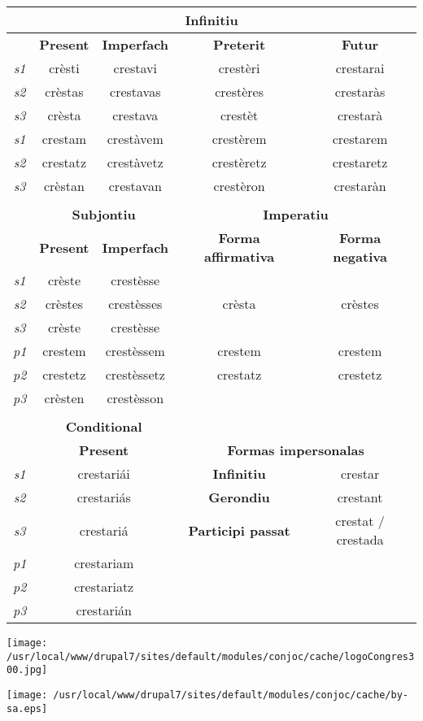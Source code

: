\documentclass[10pt,a4paper,final]{article}
\begin{document}
\begin{tabular}{|c|c|c|c|c|}
\hline 
\multicolumn{5}{|c|}{\textbf{Infinitiu}} \\ 
\hline 
 & \textbf{Present} & \textbf{Imperfach} & \textbf{Preterit} & \textbf{Futur} \\ 
\hline 
\textit{s1} & crèsti & crestavi & crestèri & crestarai \\ 
\hline 
\textit{s2} & crèstas & crestavas & crestères & crestaràs \\ 
\hline 
\textit{s3} & crèsta & crestava & crestèt & crestarà \\ 
\hline 
\textit{s1} & crestam & crestàvem & crestèrem & crestarem \\ 
\hline 
\textit{s2} & crestatz & crestàvetz & crestèretz & crestaretz \\ 
\hline 
\textit{s3} & crèstan & crestavan & crestèron & crestaràn \\ 
\hline 
\multicolumn{5}{|c|}{} \\ 
\hline 
 & \multicolumn{2}{c|}{\textbf{Subjontiu}}  & \multicolumn{2}{c|}{\textbf{Imperatiu}} \\ 
\hline 
 & \textbf{Present} & \textbf{Imperfach} & \textbf{Forma affirmativa} & \textbf{Forma negativa} \\ 
\hline 
\textit{s1} & crèste & crestèsse & \multicolumn{2}{c|}{} \\ 
\hline 
\textit{s2} & crèstes & crestèsses & crèsta & crèstes \\ 
\hline 
\textit{s3} & crèste & crestèsse & \multicolumn{2}{c|}{} \\ 
\hline 
\textit{p1} & crestem & crestèssem & crestem & crestem \\ 
\hline 
\textit{p2} & crestetz & crestèssetz & crestatz & crestetz \\ 
\hline 
\textit{p3} & crèsten & crestèsson & \multicolumn{2}{c|}{} \\ 
\hline 
\multicolumn{5}{|c|}{} \\ 
\hline 
 & \multicolumn{2}{c|}{\textbf{Conditional}} & \multicolumn{2}{c|}{} \\ 
\hline 
 &  \multicolumn{2}{c|}{\textbf{Present}} & \multicolumn{2}{c|}{\textbf{Formas impersonalas}}  \\ 
\hline 
\textit{s1} & \multicolumn{2}{c|}{crestariái}  & \textbf{Infinitiu} & crestar \\ 
\hline 
\textit{s2} & \multicolumn{2}{c|}{crestariás}  & \textbf{Gerondiu} & crestant \\ 
\hline 
\textit{s3} & \multicolumn{2}{c|}{crestariá}  & \textbf{Participi passat} & crestat / crestada \\ 
\hline 
\textit{p1} & \multicolumn{2}{c|}{crestariam} & \multicolumn{2}{c|}{} \\ 
\hline 
\textit{p2} & \multicolumn{2}{c|}{crestariatz} & \multicolumn{2}{c|}{} \\ 
\hline 
\textit{p3} & \multicolumn{2}{c|}{crestarián} & \multicolumn{2}{c|}{} \\ 
\hline 
\end{tabular}

\begin{center}
\texttt{[image: /usr/local/www/drupal7/sites/default/modules/conjoc/cache/logoCongres300.jpg]}
\end{center}

\hfill\texttt{[image: /usr/local/www/drupal7/sites/default/modules/conjoc/cache/by-sa.eps]}
\end{document}
